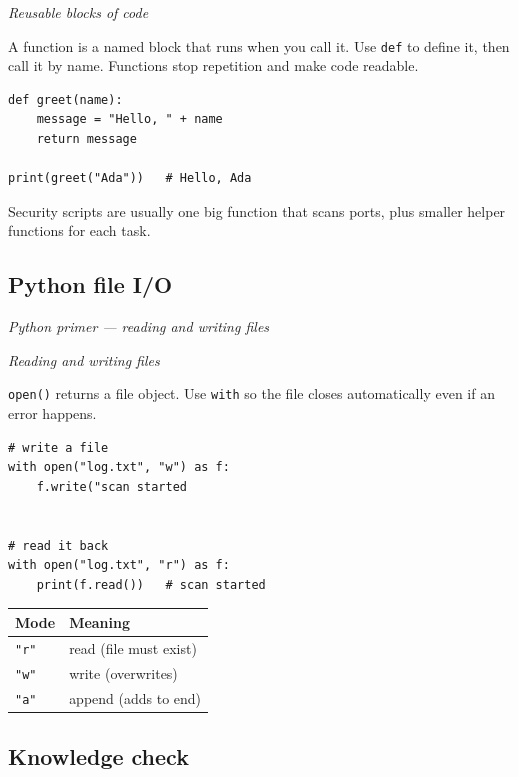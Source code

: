 \documentclass[12pt,openany]{book}
\begin{document}
{\small\itshape\color{gray}Reusable blocks of code}

A function is a named block that runs when you call it. Use \texttt{def} to define it, then call it by name. Functions stop repetition and make code readable.


\begin{lstlisting}
def greet(name):
    message = "Hello, " + name
    return message

print(greet("Ada"))   # Hello, Ada\end{lstlisting}


Security scripts are usually one big function that scans ports, plus smaller helper functions for each task.

\medskip

\subsection*{Python file I/O}
{\small\itshape\color{gray}Python primer --- reading and writing files}

{\small\itshape\color{gray}Reading and writing files}

\texttt{open()} returns a file object. Use \texttt{with} so the file closes automatically even if an error happens.


\begin{lstlisting}
# write a file
with open("log.txt", "w") as f:
    f.write("scan started


# read it back
with open("log.txt", "r") as f:
    print(f.read())   # scan started\end{lstlisting}


\begin{center}\small\begin{tabular}{p{6.5cm}p{6.5cm}}\toprule
\textbf{Mode} & \textbf{Meaning} \\ \midrule
\texttt{"r"} & read (file must exist) \\
\texttt{"w"} & write (overwrites) \\
\texttt{"a"} & append (adds to end) \\
\bottomrule\end{tabular}\end{center}

\medskip

\subsection*{Knowledge check}
\end{document}
